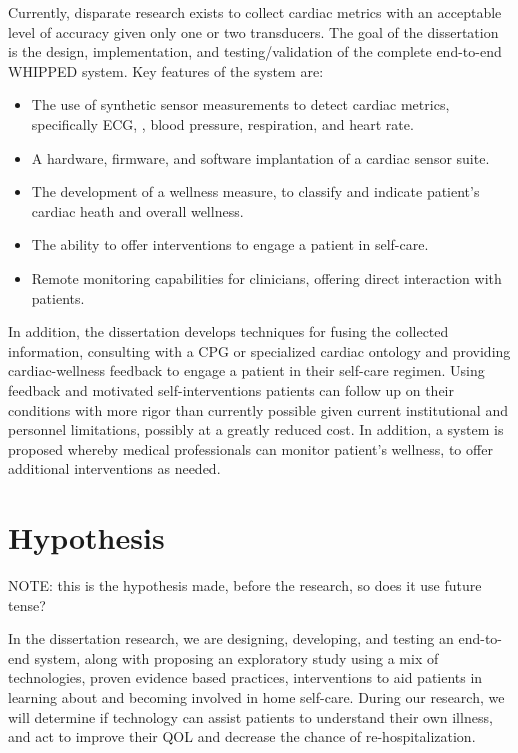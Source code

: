 Currently, disparate research exists to collect cardiac metrics with an acceptable level of accuracy given only one or two transducers. The goal of the dissertation is the design, implementation, and testing/validation of the complete end-to-end WHIPPED system. Key features of the system are:

\begin{itemize}
\item The use of synthetic sensor measurements to detect cardiac metrics, specifically ECG, , blood pressure, respiration, and heart rate.
\item A hardware, firmware, and software implantation of a cardiac sensor suite.
\item The development of a wellness measure, to classify and indicate patient's cardiac heath and overall wellness. \cite{Chaiyasucheeva2012}
\item The ability to offer interventions to engage a patient in self-care.
\item Remote monitoring capabilities for clinicians, offering direct interaction with patients.
\end{itemize}

In addition, the dissertation develops techniques for fusing the collected information, consulting with a CPG or specialized cardiac ontology and providing cardiac-wellness feedback to engage a patient in their self-care regimen. Using feedback and motivated self-interventions patients can follow up on their conditions with more rigor than currently possible given current institutional and personnel limitations, possibly at a greatly reduced cost. In addition, a system is proposed whereby medical professionals can monitor patient's wellness, to offer additional interventions as needed.

\section{Hypothesis}
\label{sec:Hypothesis}

NOTE: this is the hypothesis made, before the research, so does it use future tense?

In the dissertation research, we are designing, developing, and testing an end-to-end system, along with proposing an exploratory study using a mix of technologies, proven evidence based practices, interventions to aid patients in learning about and becoming involved in home self-care. During our research, we will determine if technology can assist patients to understand their own illness, and act to improve their QOL and decrease the chance of re-hospitalization. 

